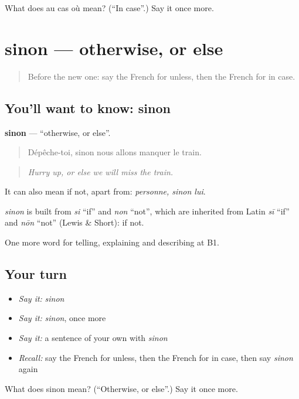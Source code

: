 \begin{tcolorbox}[breakable,colback=teal!4,colframe=teal!35!black,title={Before you move on}]
What does au cas où mean? (\textquotedblleft{}In case\textquotedblright{}.) Say it once more.
\end{tcolorbox}
\section[sinon]{sinon — otherwise, or else}

\label{lesson:FR-C368-sinon}



\begin{quote}
Before the new one: say the French for unless, then the French for in case.
\end{quote}

\subsection*{You'll want to know: sinon}
\textbf{sinon} — \textquotedblleft{}otherwise, or else\textquotedblright{}.

\begin{quote}
Dépêche-toi, sinon nous allons manquer le train.
\end{quote}

\begin{quote}
\emph{Hurry up, or else we will miss the train.}
\end{quote}

It can also mean if not, apart from: \emph{personne, sinon lui}.

\begin{cousinweb}
\emph{sinon} is built from \emph{si} \textquotedblleft{}if\textquotedblright{} and \emph{non} \textquotedblleft{}not\textquotedblright{}, which are inherited from Latin \emph{sī} \textquotedblleft{}if\textquotedblright{} and \emph{nōn} \textquotedblleft{}not\textquotedblright{} (Lewis \& Short): if not.
\end{cousinweb}

\begin{grammarlens}[title={What you've built}]
One more word for telling, explaining and describing at B1.
\end{grammarlens}

\subsection*{Your turn}
\begin{itemize}
\raggedright
  \item \emph{Say it:} \emph{sinon}
  \item \emph{Say it:} \emph{sinon}, once more
  \item \emph{Say it:} a sentence of your own with \emph{sinon}
  \item \emph{Recall:} say the French for unless, then the French for in case, then say \emph{sinon} again
\end{itemize}

\begin{tcolorbox}[breakable,colback=teal!4,colframe=teal!35!black,title={Before you move on}]
What does sinon mean? (\textquotedblleft{}Otherwise, or else\textquotedblright{}.) Say it once more.
\end{tcolorbox}
